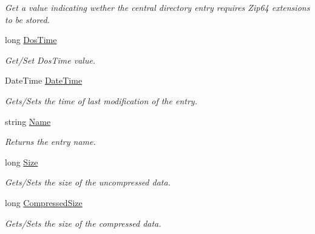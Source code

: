 \begin{DoxyCompactItemize}
\begin{DoxyCompactList}\small\item\em Get a value indicating wether the central directory entry requires Zip64 extensions to be stored. \end{DoxyCompactList}\item 
long \hyperlink{class_i_c_sharp_code_1_1_sharp_zip_lib_1_1_zip_1_1_zip_entry_a7109fba91243e2e6f235514a516f55a1}{Dos\+Time}
\begin{DoxyCompactList}\small\item\em Get/\+Set Dos\+Time value. \end{DoxyCompactList}\item 
Date\+Time \hyperlink{class_i_c_sharp_code_1_1_sharp_zip_lib_1_1_zip_1_1_zip_entry_a1771dc696c0266c7ed4908246f3e1329}{Date\+Time}
\begin{DoxyCompactList}\small\item\em Gets/\+Sets the time of last modification of the entry. \end{DoxyCompactList}\item 
string \hyperlink{class_i_c_sharp_code_1_1_sharp_zip_lib_1_1_zip_1_1_zip_entry_af515c85f6f5599b4c0650e2ea63230ac}{Name}
\begin{DoxyCompactList}\small\item\em Returns the entry name. \end{DoxyCompactList}\item 
long \hyperlink{class_i_c_sharp_code_1_1_sharp_zip_lib_1_1_zip_1_1_zip_entry_a02ebed1814a50d1edc30579332ac74d3}{Size}
\begin{DoxyCompactList}\small\item\em Gets/\+Sets the size of the uncompressed data. \end{DoxyCompactList}\item 
long \hyperlink{class_i_c_sharp_code_1_1_sharp_zip_lib_1_1_zip_1_1_zip_entry_a5bfff25f9a289baca533f5f6c194e1ca}{Compressed\+Size}
\begin{DoxyCompactList}\small\item\em Gets/\+Sets the size of the compressed data. \end{DoxyCompactList}\item 

\end{DoxyCompactItemize}
